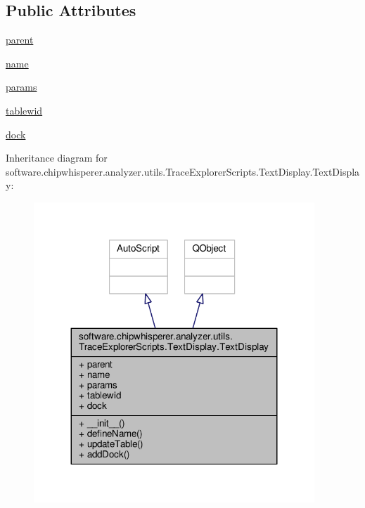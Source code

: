 \subsection*{Public Attributes}
\begin{DoxyCompactItemize}
\item 
\hyperlink{classsoftware_1_1chipwhisperer_1_1analyzer_1_1utils_1_1TraceExplorerScripts_1_1TextDisplay_1_1TextDisplay_a3f9f06adb837b2fb65658332889f7627}{parent}
\item 
\hyperlink{classsoftware_1_1chipwhisperer_1_1analyzer_1_1utils_1_1TraceExplorerScripts_1_1TextDisplay_1_1TextDisplay_a24bcea32336c8d061e98c8a3cc290fd8}{name}
\item 
\hyperlink{classsoftware_1_1chipwhisperer_1_1analyzer_1_1utils_1_1TraceExplorerScripts_1_1TextDisplay_1_1TextDisplay_aa746b6ba4210f05f336a2700dda77106}{params}
\item 
\hyperlink{classsoftware_1_1chipwhisperer_1_1analyzer_1_1utils_1_1TraceExplorerScripts_1_1TextDisplay_1_1TextDisplay_aa90056ffb91888871d160220669fbb60}{tablewid}
\item 
\hyperlink{classsoftware_1_1chipwhisperer_1_1analyzer_1_1utils_1_1TraceExplorerScripts_1_1TextDisplay_1_1TextDisplay_a72c2d5327ebfc02f3b4e6866ac18cdb7}{dock}
\end{DoxyCompactItemize}


Inheritance diagram for software.\+chipwhisperer.\+analyzer.\+utils.\+Trace\+Explorer\+Scripts.\+Text\+Display.\+Text\+Display\+:\nopagebreak
\begin{figure}[H]
\begin{center}
\leavevmode
\includegraphics[width=299pt]{dd/d78/classsoftware_1_1chipwhisperer_1_1analyzer_1_1utils_1_1TraceExplorerScripts_1_1TextDisplay_1_1TextDisplay__inherit__graph}
\end{center}
\end{figure}


